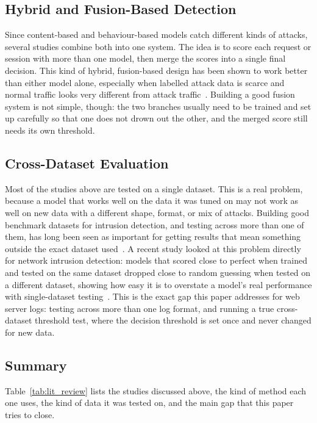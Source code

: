 \documentclass[futureinternet,article,submit,moreauthors]{Definitions/mdpi}
\begin{document}
\subsection{Hybrid and Fusion-Based Detection}

Since content-based and behaviour-based models catch different kinds of attacks, several studies combine both into one system. The idea is to score each request or session with more than one model, then merge the scores into a single final decision. This kind of hybrid, fusion-based design has been shown to work better than either model alone, especially when labelled attack data is scarce and normal traffic looks very different from attack traffic~\cite{kamal2025}. Building a good fusion system is not simple, though: the two branches usually need to be trained and set up carefully so that one does not drown out the other, and the merged score still needs its own threshold.

\subsection{Cross-Dataset Evaluation}

Most of the studies above are tested on a single dataset. This is a real problem, because a model that works well on the data it was tuned on may not work as well on new data with a different shape, format, or mix of attacks. Building good benchmark datasets for intrusion detection, and testing across more than one of them, has long been seen as important for getting results that mean something outside the exact dataset used~\cite{shiravi2012}. A recent study looked at this problem directly for network intrusion detection: models that scored close to perfect when trained and tested on the same dataset dropped close to random guessing when tested on a different dataset, showing how easy it is to overstate a model's real performance with single-dataset testing~\cite{cantone2024}. This is the exact gap this paper addresses for web server logs: testing across more than one log format, and running a true cross-dataset threshold test, where the decision threshold is set once and never changed for new data.

\subsection{Summary}

Table~\ref{tab:lit_review} lists the studies discussed above, the kind of method each one uses, the kind of data it was tested on, and the main gap that this paper tries to close.
\end{document}
